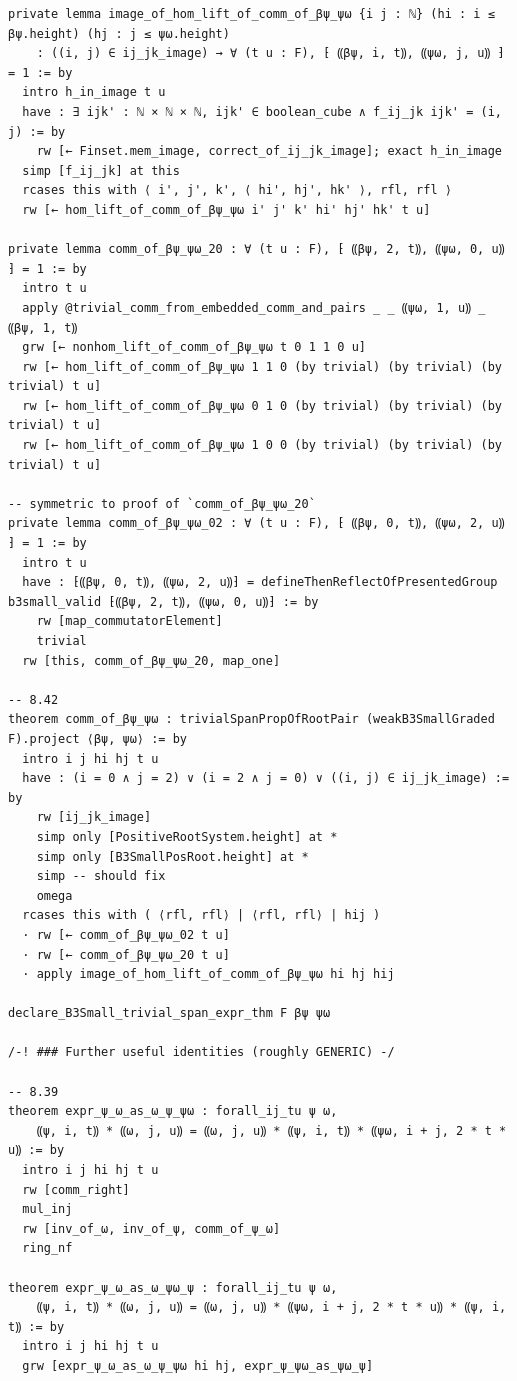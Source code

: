 \begin{Verbatim}
private lemma image_of_hom_lift_of_comm_of_βψ_ψω {i j : ℕ} (hi : i ≤ βψ.height) (hj : j ≤ ψω.height)
    : ((i, j) ∈ ij_jk_image) → ∀ (t u : F), ⁅ ⸨βψ, i, t⸩, ⸨ψω, j, u⸩ ⁆ = 1 := by
  intro h_in_image t u
  have : ∃ ijk' : ℕ × ℕ × ℕ, ijk' ∈ boolean_cube ∧ f_ij_jk ijk' = (i, j) := by
    rw [← Finset.mem_image, correct_of_ij_jk_image]; exact h_in_image
  simp [f_ij_jk] at this
  rcases this with ⟨ i', j', k', ⟨ hi', hj', hk' ⟩, rfl, rfl ⟩
  rw [← hom_lift_of_comm_of_βψ_ψω i' j' k' hi' hj' hk' t u]

private lemma comm_of_βψ_ψω_20 : ∀ (t u : F), ⁅ ⸨βψ, 2, t⸩, ⸨ψω, 0, u⸩ ⁆ = 1 := by
  intro t u
  apply @trivial_comm_from_embedded_comm_and_pairs _ _ ⸨ψω, 1, u⸩ _ ⸨βψ, 1, t⸩
  grw [← nonhom_lift_of_comm_of_βψ_ψω t 0 1 1 0 u]
  rw [← hom_lift_of_comm_of_βψ_ψω 1 1 0 (by trivial) (by trivial) (by trivial) t u]
  rw [← hom_lift_of_comm_of_βψ_ψω 0 1 0 (by trivial) (by trivial) (by trivial) t u]
  rw [← hom_lift_of_comm_of_βψ_ψω 1 0 0 (by trivial) (by trivial) (by trivial) t u]

-- symmetric to proof of `comm_of_βψ_ψω_20`
private lemma comm_of_βψ_ψω_02 : ∀ (t u : F), ⁅ ⸨βψ, 0, t⸩, ⸨ψω, 2, u⸩ ⁆ = 1 := by
  intro t u
  have : ⁅⸨βψ, 0, t⸩, ⸨ψω, 2, u⸩⁆ = defineThenReflectOfPresentedGroup b3small_valid ⁅⸨βψ, 2, t⸩, ⸨ψω, 0, u⸩⁆ := by
    rw [map_commutatorElement]
    trivial
  rw [this, comm_of_βψ_ψω_20, map_one]

-- 8.42
theorem comm_of_βψ_ψω : trivialSpanPropOfRootPair (weakB3SmallGraded F).project ⟨βψ, ψω⟩ := by
  intro i j hi hj t u
  have : (i = 0 ∧ j = 2) ∨ (i = 2 ∧ j = 0) ∨ ((i, j) ∈ ij_jk_image) := by
    rw [ij_jk_image]
    simp only [PositiveRootSystem.height] at *
    simp only [B3SmallPosRoot.height] at *
    simp -- should fix
    omega
  rcases this with ( ⟨rfl, rfl⟩ | ⟨rfl, rfl⟩ | hij )
  · rw [← comm_of_βψ_ψω_02 t u]
  · rw [← comm_of_βψ_ψω_20 t u]
  · apply image_of_hom_lift_of_comm_of_βψ_ψω hi hj hij

declare_B3Small_trivial_span_expr_thm F βψ ψω

/-! ### Further useful identities (roughly GENERIC) -/

-- 8.39
theorem expr_ψ_ω_as_ω_ψ_ψω : forall_ij_tu ψ ω,
    ⸨ψ, i, t⸩ * ⸨ω, j, u⸩ = ⸨ω, j, u⸩ * ⸨ψ, i, t⸩ * ⸨ψω, i + j, 2 * t * u⸩ := by
  intro i j hi hj t u
  rw [comm_right]
  mul_inj
  rw [inv_of_ω, inv_of_ψ, comm_of_ψ_ω]
  ring_nf

theorem expr_ψ_ω_as_ω_ψω_ψ : forall_ij_tu ψ ω,
    ⸨ψ, i, t⸩ * ⸨ω, j, u⸩ = ⸨ω, j, u⸩ * ⸨ψω, i + j, 2 * t * u⸩ * ⸨ψ, i, t⸩ := by
  intro i j hi hj t u
  grw [expr_ψ_ω_as_ω_ψ_ψω hi hj, expr_ψ_ψω_as_ψω_ψ]


\end{Verbatim}
